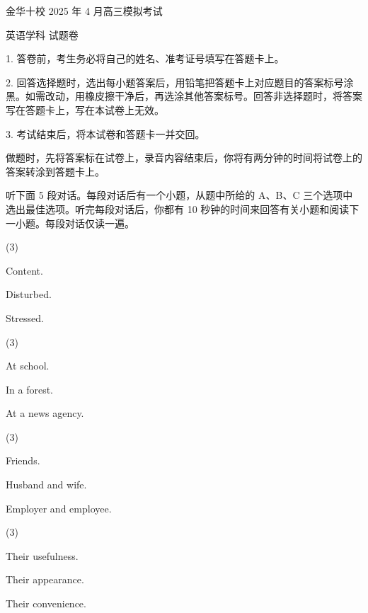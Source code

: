 \documentclass{英语试卷}
\begin{document}
\par 金华十校 2025 年 4 月高三模拟考试\par
\par 英语学科 试题卷\par
\begin{notice}
\par 1. 答卷前，考生务必将自己的姓名、准考证号填写在答题卡上。\par
\par 2. 回答选择题时，选出每小题答案后，用铅笔把答题卡上对应题目的答案标号涂黑。如需改动，用橡皮擦干净后，再选涂其他答案标号。回答非选择题时，将答案写在答题卡上，写在本试卷上无效。\par
\par 3. 考试结束后，将本试卷和答题卡一并交回。\par
\end{notice}
\par 做题时，先将答案标在试卷上，录音内容结束后，你将有两分钟的时间将试卷上的答案转涂到答题卡上。\par
{}
\par 听下面 5 段对话。每段对话后有一个小题，从题中所给的 A、B、C 三个选项中选出最佳选项。听完每段对话后，你都有 10 秒钟的时间来回答有关小题和阅读下一小题。每段对话仅读一遍。\par
{}
\begin{choices}(3)
  \item Content.
  \item Disturbed.
  \item Stressed.
\end{choices}
\begin{choices}(3)
  \item At school.
  \item In a forest.
  \item At a news agency.
\end{choices}
\begin{choices}(3)
  \item Friends.
  \item Husband and wife.
  \item Employer and employee.
\end{choices}
\begin{choices}(3)
  \item Their usefulness.
  \item Their appearance.
  \item Their convenience.
\end{choices}
\end{document}
